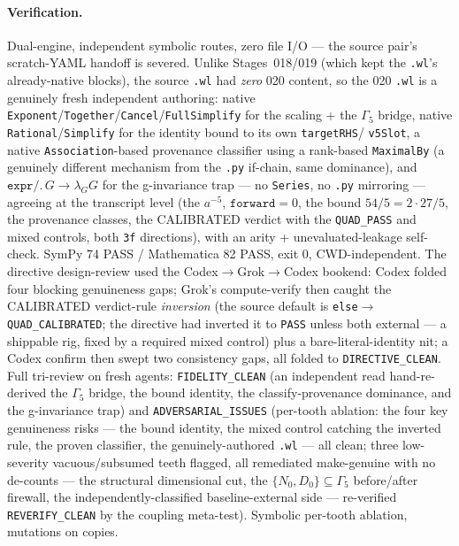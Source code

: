 \paragraph{Verification.}
Dual-engine, independent symbolic routes, zero file I/O --- the source pair's scratch-YAML handoff is
severed. Unlike Stages~018/019 (which kept the \texttt{.wl}'s already-native blocks), the source \texttt{.wl}
had \emph{zero} 020 content, so the 020 \texttt{.wl} is a genuinely fresh independent authoring: native
\texttt{Exponent}/\texttt{Together}/\texttt{Cancel}/\texttt{FullSimplify} for the scaling + the \(\Gamma_5\)
bridge, native \texttt{Rational}/\texttt{Simplify} for the identity bound to its own \texttt{targetRHS}/
\texttt{v5Slot}, a native \texttt{Association}-based provenance classifier using a rank-based \texttt{MaximalBy}
(a genuinely different mechanism from the \texttt{.py} if-chain, same dominance), and \(\texttt{expr}/.\,G\to\lambda_G G\)
for the g-invariance trap --- no \texttt{Series}, no \texttt{.py} mirroring --- agreeing at the transcript level
(the \(a^{-5}\), \(\texttt{forward}=0\), the bound \(54/5=2\cdot27/5\), the provenance classes, the CALIBRATED
verdict with the \texttt{QUAD\_PASS} and mixed controls, both \texttt{3f} directions), with an arity +
unevaluated-leakage self-check. SymPy 74 PASS / Mathematica 82 PASS, exit 0, CWD-independent. The directive
design-review used the Codex\(\to\)Grok\(\to\)Codex bookend: Codex folded four blocking genuineness gaps; Grok's
compute-verify then caught the CALIBRATED verdict-rule \emph{inversion} (the source default is
\texttt{else}\(\to\)\texttt{QUAD\_CALIBRATED}; the directive had inverted it to \texttt{PASS} unless both
external --- a shippable rig, fixed by a required mixed control) plus a bare-literal-identity nit; a Codex
confirm then swept two consistency gaps, all folded to \texttt{DIRECTIVE\_CLEAN}. Full tri-review on fresh
agents: \texttt{FIDELITY\_CLEAN} (an independent read hand-re-derived the \(\Gamma_5\) bridge, the bound
identity, the classify-provenance dominance, and the g-invariance trap) and \texttt{ADVERSARIAL\_ISSUES}
(per-tooth ablation: the four key genuineness risks --- the bound identity, the mixed control catching the
inverted rule, the proven classifier, the genuinely-authored \texttt{.wl} --- all clean; three low-severity
vacuous/subsumed teeth flagged, all remediated make-genuine with no de-counts --- the structural dimensional
cut, the \(\{N_0,D_0\}\subseteq\Gamma_5\) before/after firewall, the independently-classified baseline-external
side --- re-verified \texttt{REVERIFY\_CLEAN} by the coupling meta-test). Symbolic per-tooth ablation, mutations
on copies.

